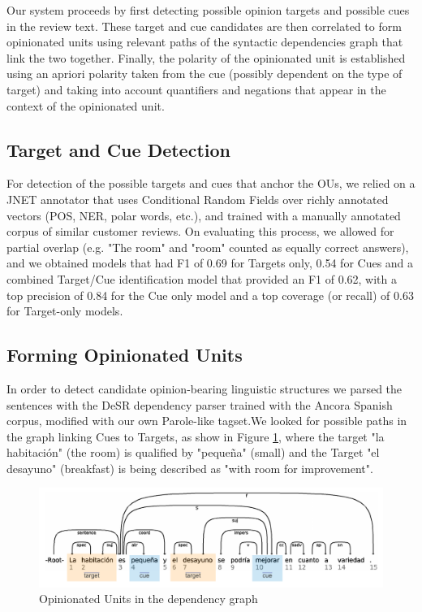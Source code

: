 \documentclass{llncs}
\begin{document}
Our system proceeds by first detecting possible opinion targets and possible cues in the review text. These target and cue candidates are then correlated to form opinionated units using relevant paths of the  syntactic dependencies graph that link the two together. Finally, the polarity of the opinionated unit is established using an apriori polarity taken from the cue (possibly dependent on the type of target) and taking into account quantifiers and negations that appear in the context of the opinionated unit.

\subsection{Target and Cue Detection}

For detection of the possible targets and cues that anchor the OUs, we relied on a JNET annotator that uses Conditional Random Fields over richly annotated vectors (POS, NER, polar words, etc.), and trained with a manually annotated corpus of similar customer reviews. 
On evaluating this process, we allowed for partial overlap (e.g. "The room" and "room" counted as equally correct answers), and we obtained models that had F1 of 0.69 for  Targets only, 0.54 for Cues and a combined Target/Cue identification model that provided an F1 of 0.62, with a top precision of 0.84 for the Cue only model and a top coverage (or recall) of 0.63 for Target-only models.


\subsection{Forming Opinionated Units}

In order to detect candidate opinion-bearing linguistic structures we parsed the sentences with the DeSR dependency parser trained with the Ancora Spanish corpus, modified with our own Parole-like tagset.We looked for possible paths in the graph linking Cues to Targets, as show in Figure  \ref{fig:GRAFO}, where the target "la habitación" (the room) is qualified by "pequeña" (small) and the Target "el desayuno" (breakfast) is being described as "with room for improvement".

\begin{figure}[ht]
\centering
\includegraphics[width=12cm]{grafo.pdf}
\caption{Opinionated Units in the dependency graph}
\label{fig:GRAFO}
\end{figure}
\end{document}
